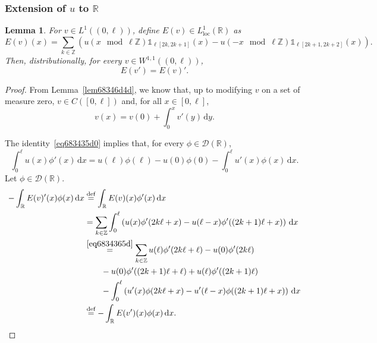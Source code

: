 \documentclass[a4paper,9pt]{amsart}
\newcommand{\scr}[1]{\mathscr{#1}}
\newcommand{\Z}{\mathbb{Z}}	%
\newcommand{\R}{\mathbb{R}}	%
\newcommand{\did}{\,\mathrm{d}}	%
\newcommand{\loc}{\mathrm{loc}}
\newcommand{\one}{{\mathds 1\!}}
\theoremstyle{plain}
\newtheorem{lemma}[proposition]{Lemma}
\theoremstyle{definition}
\theoremstyle{remark}
\begin{document}
\subsubsection{Extension of $u$ to $\R$}

\begin{lemma}\label{lem68344adb}
	For $v\in L^1((0,\ell))$, define $E(v)\in L^1_\loc(\R)$ as
	\begin{equation}
		E(v)(x) = \sum_{k\in\Z} \left( u(x\mod\ell\Z) \one_{\ell[2k,2k+1]}(x) 
			- u(-x\mod\ell\Z) \one_{\ell[2k+1,2k+2]}(x) \right) .
	\end{equation}
	Then, distributionally, for every $v\in W^{1,1}((0,\ell))$,
	\begin{equation}\label{eq6834343d}
		E(v') = E(v)' .
	\end{equation}
\end{lemma}
\begin{proof}
	From Lemma~\ref{lem68346d4d}, we know that, up to modifying $v$ on a set of measure zero, $v\in C([0,\ell])$ 
	and, for all $x\in[0,\ell]$,
	\begin{equation}\label{eq683435d0}
		v(x) = v(0) + \int_0^x v'(y) \did y .
	\end{equation}
	
	The identity~\eqref{eq683435d0} implies that, for every $\phi\in\scr D(\R)$,
	\begin{equation}\label{eq6834365d}
		\int_0^\ell u(x) \phi'(x) \did x
		= u(\ell)\phi(\ell) - u(0) \phi(0) - \int_0^\ell u'(x) \phi(x) \did x .
	\end{equation}
	Let $\phi\in\scr D(\R)$.
	\begin{align}
		- \int_\R E(v)'(x) \phi(x) \did x
		&\overset{\text{def}}= \int_\R E(v)(x) \phi'(x) \did x \\
		&= \sum_{k\in\Z} \int_0^\ell \left( u(x) \phi'(2k\ell+x) - u(\ell-x) \phi'((2k+1)\ell+x) \right) \did x \\
		&\overset{\eqref{eq6834365d}}=  \sum_{k\in\Z} u(\ell) \phi'(2k\ell+\ell) - u(0) \phi'(2k\ell) \\
		&\qquad	- u(0) \phi'((2k+1)\ell+\ell) + u(\ell) \phi'((2k+1)\ell)  \\
		&\qquad - \int_0^\ell \left( u'(x) \phi(2k\ell+x) - u'(\ell-x) \phi((2k+1)\ell+x) \right) \did x \\
		&\overset{\text{def}}= - \int_\R E(v')(x) \phi(x) \did x .
	\end{align}
\end{proof}
\end{document}
